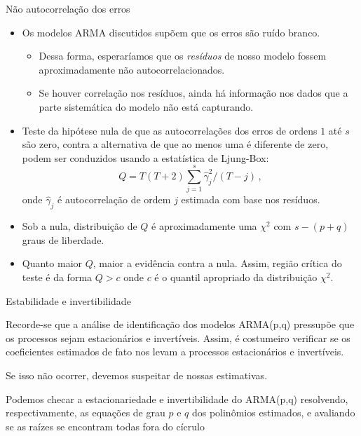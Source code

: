 \documentclass[11pt]{beamer}
\newenvironment{halfwideitemize}{\itemize\addtolength{\itemsep}{0.5em}}{\enditemize}
\begin{document}
\begin{frame}{Não autocorrelação dos erros}
	\begin{itemize}
		\item Os modelos ARMA discutidos supõem que os erros são ruído branco.
		\begin{itemize}
			\item Dessa forma, esperaríamos que os \emph{resíduos} de nosso modelo fossem aproximadamente não autocorrelacionados.
			\item Se houver correlação nos resíduos, ainda há informação nos dados que a parte sistemática do modelo não está capturando.
		\end{itemize}
		\item Teste da hipótese nula de que as autocorrelações dos erros de ordens $1$ até $s$ são zero, contra a alternativa de que ao menos uma é diferente de zero, podem ser conduzidos usando a estatística de {\color{blue}Ljung-Box}:
		\begin{equation*}
			Q = T (T+2) \sum_{j=1}^s \hat{\gamma}_j^2/(T-j) \, ,
		\end{equation*}
		onde $\hat{\gamma}_j$ é autocorrelação de ordem $j$ estimada com base nos resíduos.
		
		\item Sob a nula, distribuição de $Q$ é aproximadamente uma $\chi^2$ com $s-(p+q)$ graus de liberdade.
		\item Quanto maior $Q$, maior a evidência contra a nula. Assim, região crítica do teste é da forma $Q > c$ onde $c$ é o quantil apropriado da distribuição $\chi^2$.
	\end{itemize}
\end{frame}
\begin{frame}{Estabilidade e invertibilidade}
	\begin{halfwideitemize}
		\item Recorde-se que a análise de identificação dos modelos ARMA(p,q) pressupõe que os processos sejam estacionários e invertíveis. Assim, é costumeiro verificar se os coeficientes estimados de fato nos levam a processos estacionários e invertíveis.
		\begin{halfwideitemize}
			\item Se isso não ocorrer, devemos suspeitar de nossas estimativas.
		\end{halfwideitemize}
		\item Podemos checar a estacionariedade e invertibilidade do  ARMA(p,q) resolvendo, respectivamente, as equações de grau $p$ e $q$ dos polinômios estimados, e avaliando se as raízes se encontram todas fora do cícrulo
		
	\end{halfwideitemize}
\end{frame}
\end{document}
